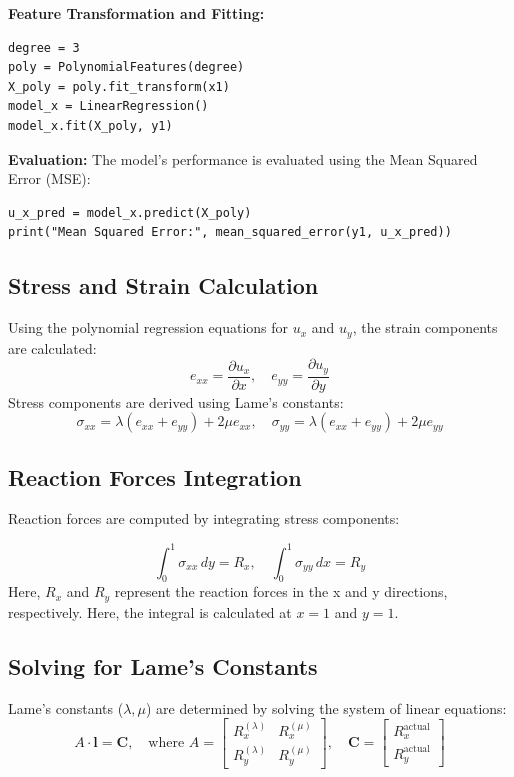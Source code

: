 \documentclass[fleqn,10pt]{olplainarticle}
\begin{document}
\textbf{Feature Transformation and Fitting:}
\begin{verbatim}
degree = 3
poly = PolynomialFeatures(degree)
X_poly = poly.fit_transform(x1)
model_x = LinearRegression()
model_x.fit(X_poly, y1)
\end{verbatim}

\textbf{Evaluation:}
The model's performance is evaluated using the Mean Squared Error (MSE):
\begin{verbatim}
u_x_pred = model_x.predict(X_poly)
print("Mean Squared Error:", mean_squared_error(y1, u_x_pred))
\end{verbatim}

\subsection{Stress and Strain Calculation}
Using the polynomial regression equations for \(u_x\) and \(u_y\), the strain components are calculated:
\[
e_{xx} = \frac{\partial u_x}{\partial x}, \quad
e_{yy} = \frac{\partial u_y}{\partial y}
\]
Stress components are derived using Lame's constants:
\[
\sigma_{xx} = \lambda (e_{xx} + e_{yy}) + 2\mu e_{xx}, \quad
\sigma_{yy} = \lambda (e_{xx} + e_{yy}) + 2\mu e_{yy}
\]

\subsection{Reaction Forces Integration}
Reaction forces are computed by integrating stress components:

\[
\int_0^1 \sigma_{xx} \, dy = R_x, \quad 
\int_0^1 \sigma_{yy} \, dx = R_y
\]
Here, \( R_x \) and \( R_y \) represent the reaction forces in the x and y directions, respectively. Here, the integral is calculated at \(x=1\) and \(y=1\).

\subsection{Solving for Lame's Constants}
Lame's constants (\(\lambda, \mu\)) are determined by solving the system of linear equations:
\[
A \cdot \mathbf{l} = \mathbf{C}, \quad \text{where } A = 
\begin{bmatrix}
R_x^{(\lambda)} & R_x^{(\mu)} \\
R_y^{(\lambda)} & R_y^{(\mu)}
\end{bmatrix}, \quad
\mathbf{C} = 
\begin{bmatrix}
R_x^{\text{actual}} \\
R_y^{\text{actual}}
\end{bmatrix}
\]
\end{document}

